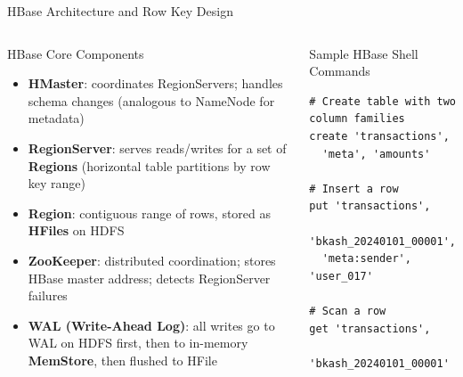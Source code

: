 \documentclass[aspectratio=169,10pt]{beamer}
\begin{document}
\begin{frame}[fragile]{HBase Architecture and Row Key Design}
  \begin{columns}[T]
      \begin{block}{HBase Core Components}
        \begin{itemize}
          \item \textbf{HMaster}: coordinates RegionServers; handles schema changes (analogous to NameNode for metadata)
          \item \textbf{RegionServer}: serves reads/writes for a set of \textbf{Regions} (horizontal table partitions by row key range)
          \item \textbf{Region}: contiguous range of rows, stored as \textbf{HFiles} on HDFS
          \item \textbf{ZooKeeper}: distributed coordination; stores HBase master address; detects RegionServer failures
          \item \textbf{WAL (Write-Ahead Log)}: all writes go to WAL on HDFS first, then to in-memory \textbf{MemStore}, then flushed to HFile
        \end{itemize}
      \end{block}
      \vspace{4pt}
      \begin{exampleblock}{Sample HBase Shell Commands}
        \begin{lstlisting}[language={}]
# Create table with two column families
create 'transactions',
  'meta', 'amounts'

# Insert a row
put 'transactions',
  'bkash_20240101_00001',
  'meta:sender', 'user_017'

# Scan a row
get 'transactions',
  'bkash_20240101_00001'
        \end{lstlisting}
      \end{exampleblock}


\end{columns}
\end{frame}
\end{document}
